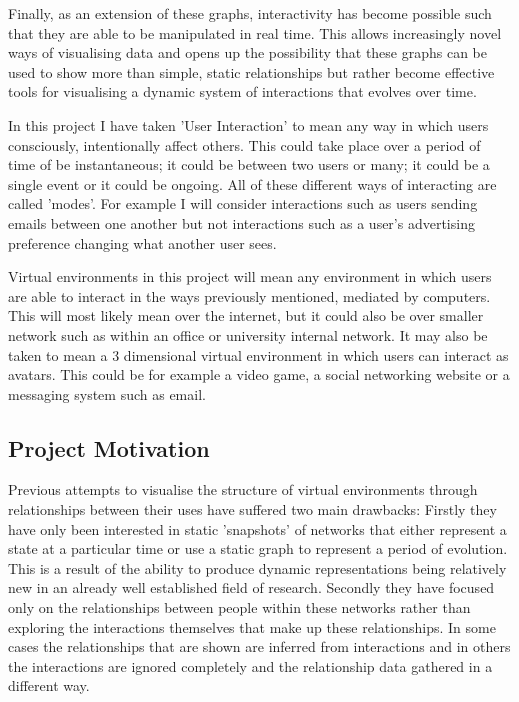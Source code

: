 \documentclass[12pt,a4paper]{article}
\begin{document}
Finally, as an extension of these graphs, interactivity has become possible such that they are able to be manipulated in real time. This allows increasingly novel ways of visualising data and opens up the possibility that these graphs can be used to show more than simple, static relationships but rather become effective tools for visualising a dynamic system of interactions that evolves over time.

In this project I have taken 'User Interaction' to mean any way in which users consciously, intentionally affect others. This could take place over a period of time of be instantaneous; it could be between two users or many; it could be a single event or it could be ongoing. All of these different ways of interacting are called 'modes'. For example I will consider interactions such as users sending emails between one another but not interactions such as a user's advertising preference changing what another user sees.

Virtual environments in this project will mean any environment in which users are able to interact in the ways previously mentioned, mediated by computers. This will most likely mean over the internet, but it could also be over smaller network such as within an office or university internal network. It may also be taken to mean a 3 dimensional virtual environment in which users can interact as avatars. This could be for example a video game, a social networking website or a messaging system such as email.

\subsection{Project Motivation}
\noindent
Previous attempts to visualise the structure of virtual environments through relationships between their uses have suffered two main drawbacks: Firstly they have only been interested in static 'snapshots' of networks that either represent a state at a particular time or use a static graph to represent a period of evolution. This is a result of the ability to produce dynamic representations being relatively new in an already well established field of research. Secondly they have focused only on the relationships between people within these networks rather than exploring the interactions themselves that make up these relationships. In some cases the relationships that are shown are inferred from interactions and in others the interactions are ignored completely and the relationship data gathered in a different way.
\end{document}
